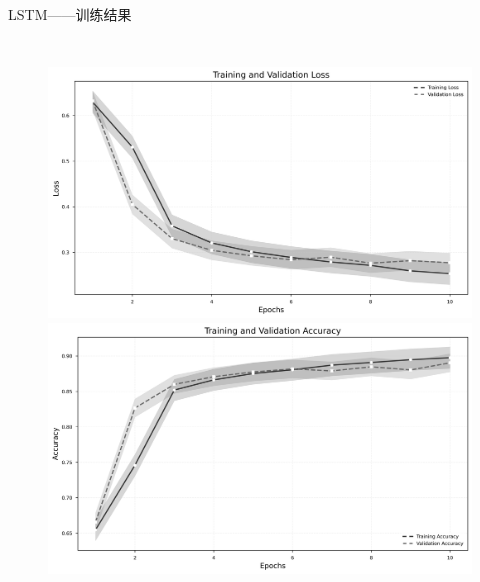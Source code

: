 \documentclass{beamer}
\begin{document}
\begin{frame}{LSTM——训练结果}
\begin{columns}
        \begin{figure}
            \includegraphics[width=\textwidth]{pic/LSTM1.png}
            \vspace{0.2cm}
            \includegraphics[width=\textwidth]{pic/LSTM2.png}
        \end{figure}
    \end{columns}
\end{frame}
\end{document}
